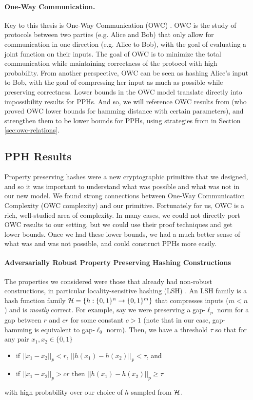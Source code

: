 \paragraph{One-Way Communication.}
Key to this thesis is One-Way Communication (OWC) \cite{Yao79,KNR95}. OWC is the study of protocols between two parties (e.g. Alice and Bob) that only allow for communication in one direction (e.g. Alice to Bob), with the goal of evaluating a joint function on their inputs. The goal of OWC is to minimize the total communication while maintaining correctness of the protocol with high probability. From another perspective, OWC can be seen as hashing Alice's input to Bob, with the goal of compressing her input as much as possible while preserving correctness. Lower bounds in the OWC model translate directly into impossibility results for PPHs. And so, we will reference OWC results from \cite{Woodruff04,Woodruff07,JKS08} (who proved OWC lower bounds for hamming distance with certain parameters), and strengthen them to be lower bounds for PPHs, using strategies from \cite{JKS08} in Section \ref{sec:owc-relations}.

\subsection{PPH Results}
Property preserving hashes were a new cryptographic primitive that we designed, and so it was important to understand what was possible and what was not in our new model. We found strong connections between One-Way Communication Complexity (OWC complexity) and our primitive. Fortunately for us, OWC is a rich, well-studied area of complexity. In many cases, we could not directly port OWC results to our setting, but we could use their proof techniques and get lower bounds. Once we had these lower bounds, we had a much better sense of what was and was not possible, and could construct PPHs more easily.

\paragraph{Adversarially Robust Property Preserving Hashing Constructions}
The properties we considered were those that already had non-robust constructions, in particular locality-sensitive hashing (LSH) \cite{IndykM98}. An LSH family is a hash function family ${\cal H} = \{ h:\{0,1\}^n \to \{0,1\}^m \}$ that compresses inputs ($m < n$) and is \emph{mostly} correct. For example, say we were preserving a gap-$\ell_p$ norm for a gap between $r$ and $cr$ for some constant $c > 1$ (note that in our case, gap-hamming is equivalent to gap-$\ell_0$ norm). Then, we have a threshold $\tau$ so that for any pair $x_1, x_2 \in \{0,1\}$
\begin{itemize}
	\item if $||x_1 - x_2||_p < r$, $||h(x_1) - h(x_2)||_p < \tau$, and
	\item if $||x_1 - x_2||_p > cr$ then $||h(x_1) - h(x_2)||_p \ge \tau$
\end{itemize}
with high probability over our choice of $h$ sampled from ${\cal H}$.

